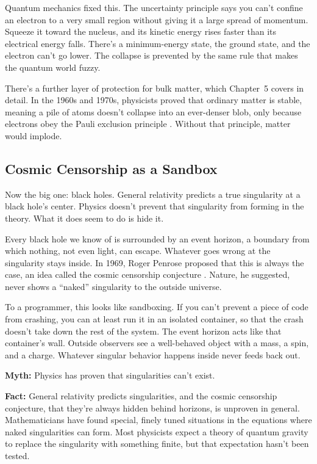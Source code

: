 Quantum mechanics fixed this. The uncertainty principle says you can't confine an electron to a very small region without giving it a large spread of momentum. Squeeze it toward the nucleus, and its kinetic energy rises faster than its electrical energy falls. There's a minimum-energy state, the ground state, and the electron can't go lower. The collapse is prevented by the same rule that makes the quantum world fuzzy.

There's a further layer of protection for bulk matter, which Chapter~5 covers in detail. In the 1960s and 1970s, physicists proved that ordinary matter is stable, meaning a pile of atoms doesn't collapse into an ever-denser blob, only because electrons obey the Pauli exclusion principle \cite{liebthirring1975}. Without that principle, matter would implode.

\subsection{Cosmic Censorship as a Sandbox}

Now the big one: black holes. General relativity predicts a true singularity at a black hole's center. Physics doesn't prevent that singularity from forming in the theory. What it does seem to do is hide it.

Every black hole we know of is surrounded by an event horizon, a boundary from which nothing, not even light, can escape. Whatever goes wrong at the singularity stays inside. In 1969, Roger Penrose proposed that this is always the case, an idea called the cosmic censorship conjecture \cite{penrose1969}. Nature, he suggested, never shows a ``naked'' singularity to the outside universe.

To a programmer, this looks like sandboxing. If you can't prevent a piece of code from crashing, you can at least run it in an isolated container, so that the crash doesn't take down the rest of the system. The event horizon acts like that container's wall. Outside observers see a well-behaved object with a mass, a spin, and a charge. Whatever singular behavior happens inside never feeds back out.

\begin{mythvsfactbox}
\textbf{Myth:} Physics has proven that singularities can't exist.

\textbf{Fact:} General relativity predicts singularities, and the cosmic censorship conjecture, that they're always hidden behind horizons, is unproven in general. Mathematicians have found special, finely tuned situations in the equations where naked singularities can form. Most physicists expect a theory of quantum gravity to replace the singularity with something finite, but that expectation hasn't been tested.
\end{mythvsfactbox}

